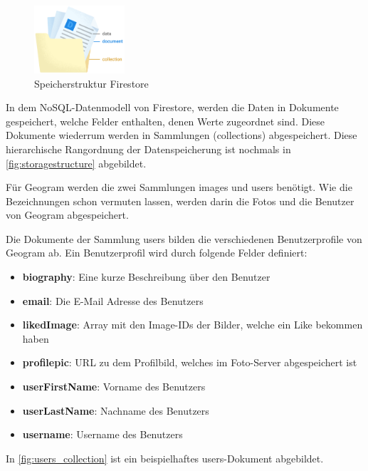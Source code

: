 \begin{figure}
    \begin{center}
        \includegraphics[width=0.3\textwidth]{images/firestore.png}
    \end{center}
    \caption{Speicherstruktur Firestore}
    \label{fig:storagestructure}
\end{figure}

In dem NoSQL-Datenmodell von Firestore, werden die Daten in Dokumente gespeichert, welche Felder enthalten, denen Werte zugeordnet sind. Diese Dokumente wiederrum werden in Sammlungen (collections) abgespeichert. Diese hierarchische Rangordnung der Datenspeicherung ist nochmals in \autoref{fig:storagestructure} abgebildet.

Für Geogram werden die zwei Sammlungen \glqq images\grqq{} und \glqq users\grqq{} benötigt. Wie die Bezeichnungen schon vermuten lassen, werden darin die Fotos und die Benutzer von Geogram abgespeichert.

Die Dokumente der Sammlung \glqq users\grqq{} bilden die verschiedenen Benutzerprofile von Geogram ab. Ein Benutzerprofil wird durch folgende Felder definiert:

\begin{itemize}
    \item \textbf{biography}: Eine kurze Beschreibung über den Benutzer
    \item \textbf{email}: Die E-Mail Adresse des Benutzers
    \item \textbf{likedImage}: Array mit den Image-IDs der Bilder, welche ein Like bekommen haben
    \item \textbf{profilepic}: URL zu dem Profilbild, welches im Foto-Server abgespeichert ist
    \item \textbf{userFirstName}: Vorname des Benutzers
    \item \textbf{userLastName}: Nachname des Benutzers
    \item \textbf{username}: Username des Benutzers
\end{itemize}

In \autoref{fig:users_collection} ist ein beispielhaftes users-Dokument abgebildet.

